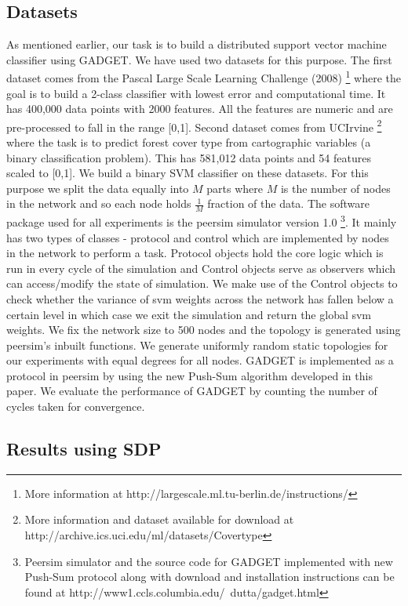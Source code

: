 \documentclass{article}
\begin{document}
\subsection{Datasets}

As mentioned earlier, our task is to build a distributed support vector machine classifier using GADGET. We have used two datasets for this purpose. The first dataset comes from the Pascal Large Scale Learning Challenge (2008)  \footnote{More information at http://largescale.ml.tu-berlin.de/instructions/} where the goal is to build a 2-class classifier with lowest error and computational time. It has 400,000 data points with 2000 features. All the features are numeric and are pre-processed to fall in the range [0,1]. Second dataset comes from UCIrvine \footnote{More information and dataset available for download at http://archive.ics.uci.edu/ml/datasets/Covertype} where the task is to predict forest cover type from cartographic variables (a binary classification problem). This has 581,012 data points and 54 features scaled to [0,1]. We build a binary SVM classifier on these datasets. For this purpose we split the data equally into $M$ parts where $M$ is the number of nodes in the network and so each node holds $\frac{1}{M}$ fraction of the data. The software package used for all experiments is the peersim simulator \cite{p2p09-peersim} version 1.0  \footnote{Peersim simulator and the source code for GADGET implemented with new Push-Sum protocol along with download and installation instructions can be found at http://www1.ccls.columbia.edu/~dutta/gadget.html}. It mainly has two types of classes - protocol and control which are implemented by nodes in the network to perform a task. Protocol objects hold the core logic which is run in every cycle of the simulation and Control objects serve as observers which can access/modify the state of simulation. We make use of the Control objects to check whether the variance of svm weights across the network has fallen below a certain level in which case we exit the simulation and return the global svm weights. We fix the network size to 500 nodes and the topology is generated using peersim's inbuilt functions. We generate uniformly random static topologies for our experiments with equal degrees for all nodes. GADGET is implemented as a protocol in peersim by using the new Push-Sum algorithm developed in this paper. We evaluate the performance of GADGET by counting the number of cycles taken for convergence.

\subsection{Results using SDP}
\end{document}
